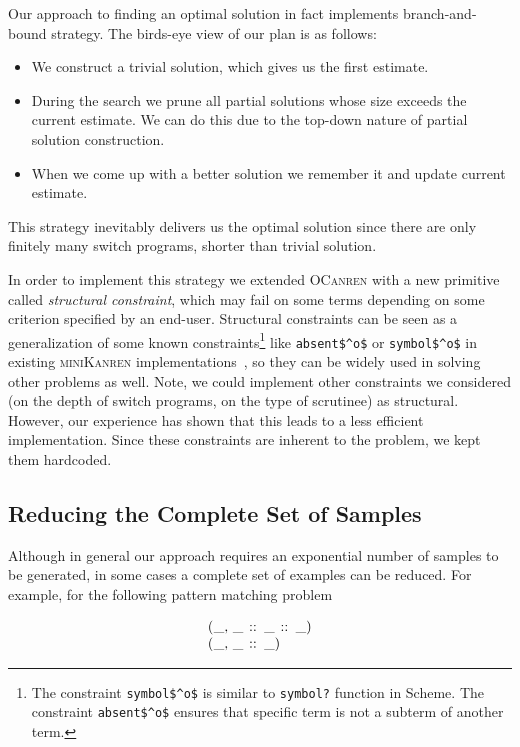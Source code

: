 Our approach to finding an optimal solution in fact implements branch-and-bound strategy. The birds-eye view of our plan is as follows:

\begin{itemize}
\item We construct a trivial solution, which gives us the first estimate.
\item During the search we prune all partial solutions whose size exceeds the current estimate. We can do this due to the top-down nature of partial solution construction.
\item When we come up with a better solution we remember it and update current estimate.
\end{itemize}

\noindent This strategy inevitably delivers us the optimal solution since there are only finitely many switch programs, shorter than trivial solution.

In order to implement this strategy we extended \textsc{OCanren} with a new primitive called \emph{structural constraint}, which may
fail on some terms depending on some criterion specified by an end-user. Structural constraints can be seen as a generalization of
some known constraints\footnote{The constraint  \lstinline|symbol$^o$| is similar to \lstinline{symbol?} function in Scheme. The constraint \lstinline|absent$^o$| ensures that specific term is not a subterm of another term.}
 like \lstinline|absent$^o$| or \lstinline|symbol$^o$|
in existing \textsc{miniKanren} implementations~\cite{Untagged},
so they can be widely used in solving other problems as well. Note, we could implement other constraints we considered (on the
depth of switch programs, on the type of scrutinee) as structural.
However, our experience has shown that this leads to
a less efficient implementation. Since these constraints are inherent to the problem, we kept them hardcoded.

\subsection{Reducing the Complete Set of Samples}
\label{sec:reduced-samples}

Although in general our approach requires an exponential number of samples to be generated, in some cases a complete set of examples can be reduced.
For example, for the following pattern matching problem

\[
\begin{array}{l}
\mbox{\lstinline|(_, _ :: _ :: _)|} \\
\mbox{\lstinline|(_, _ :: _)|}
\end{array}
\]

